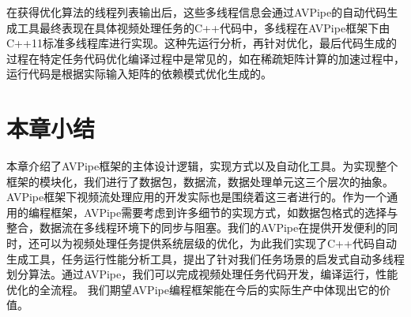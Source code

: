 
在获得优化算法的线程列表输出后，这些多线程信息会通过AVPipe的自动代码生成工具最终表现在具体视频处理任务的C++代码中，多线程在AVPipe框架下由C++11标准多线程库进行实现。这种先运行分析，再针对优化，最后代码生成的过程在特定任务代码优化编译过程中是常见的，如在稀疏矩阵计算的加速过程中，运行代码是根据实际输入矩阵的依赖模式优化生成的\cite{cheshmi2018parsy}。


\section{本章小结}
本章介绍了AVPipe框架的主体设计逻辑，实现方式以及自动化工具。为实现整个框架的模块化，我们进行了数据包，数据流，数据处理单元这三个层次的抽象。AVPipe框架下视频流处理应用的开发实际也是围绕着这三者进行的。作为一个通用的编程框架，AVPipe需要考虑到许多细节的实现方式，如数据包格式的选择与整合，数据流在多线程环境下的同步与阻塞。我们的AVPipe在提供开发便利的同时，还可以为视频处理任务提供系统层级的优化，为此我们实现了C++代码自动生成工具，任务运行性能分析工具，提出了针对我们任务场景的启发式自动多线程划分算法。通过AVPipe，我们可以完成视频处理任务代码开发，编译运行，性能优化的全流程。
我们期望AVPipe编程框架能在今后的实际生产中体现出它的价值。
